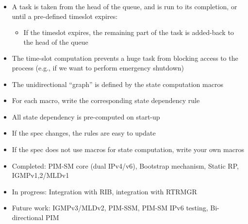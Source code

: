 \documentclass[landscape]{icsislides}
\begin{document}
\begin{slide}

\begin{itemize}
  \item A task is taken from the head of the queue, and is run to its
  completion, or until a pre-defined timeslot expires:
  \begin{itemize}
    \item If the timeslot expires, the remaining part of the task is
  added-back to the head of the queue
  \end{itemize}

  \item The time-slot computation prevents a huge task from blocking access
  to the process (e.g., if we want to perform emergency shutdown)
\end{itemize}

\end{slide}

\begin{slide}

\begin{itemize}
  \item The unidirectional ``graph'' is defined by the state computation
  macros

  \item For each macro, write the corresponding state dependency rule

  \item All state dependency is pre-computed on start-up

  \item If the spec changes, the rules are easy to update

  \item If the spec does not use macros for state computation, write your own
  macros

\end{itemize}

\end{slide}

\begin{slide}

\begin{itemize}

  \item Completed: PIM-SM core (dual IPv4/v6), Bootstrap mechanism, Static RP,
  IGMPv1,2/MLDv1

  \item In progress: Integration with RIB, integration with RTRMGR

  \item Future work: IGMPv3/MLDv2, PIM-SSM, PIM-SM IPv6 testing,
  Bi-directional PIM

\end{itemize}

\end{slide}

\end{document}
